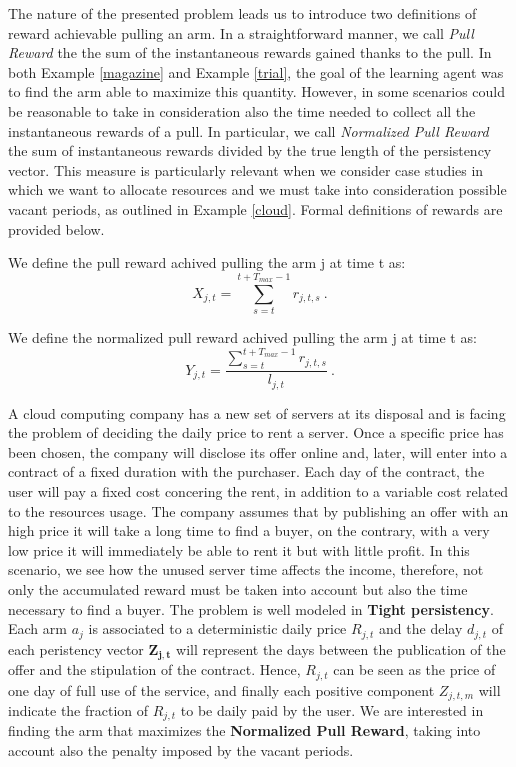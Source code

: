 The nature of the presented problem leads us to introduce two definitions of reward achievable pulling an arm. In a straightforward manner, we call \emph{Pull Reward} the the sum of the instantaneous rewards gained thanks to the pull. In both Example \ref{magazine} and Example \ref{trial}, the goal of the learning agent was to find the arm able to maximize this quantity. However, in some scenarios could be reasonable to take in consideration also the time needed to collect all the instantaneous rewards of a pull. In particular, we call \emph{Normalized Pull Reward} the sum of instantaneous rewards divided by the true length of the persistency vector.
This measure is particularly relevant when we consider case studies in which we want to allocate resources and we must take into consideration possible vacant periods, as outlined in Example \ref{cloud}.
Formal definitions of rewards are provided below.


\begin{definition}
	We define the pull reward achived pulling the arm j at time t as:
		$$X_{j,t} = \sum_{s=t}^{t+T_{max}-1} r_{j,t,s} \ .$$
\end{definition}

\begin{definition}
	We define the normalized pull reward achived pulling the arm j at time t as:
		$$Y_{j,t} = \dfrac{\sum_{s=t}^{t+T_{max}-1} r_{j,t,s}}{l_{j,t}} \ .$$
\end{definition}

\begin{example}
\label{cloud}
A cloud computing company has a new set of servers at its disposal and is facing the problem of deciding the daily price to rent a server. Once a specific price has been chosen, the company will disclose its offer online and, later, will enter into a contract of a fixed duration with the purchaser. Each day of the contract, the user will pay a fixed cost concering the rent, in addition to a variable cost related to the resources usage. The company assumes that by publishing an offer with an high price it will take a long time to find a buyer, on the contrary, with a very low price it will immediately be able to rent it but with little profit. In this scenario, we see how the unused server time affects the income, therefore, not only the accumulated reward must be taken into account but also the time necessary to find a buyer. The problem is well modeled in 	\textbf{Tight persistency}. Each arm $a_j$ is associated to a deterministic daily price $R_{j,t}$ and the delay $d_{j,t}$ of each peristency vector $\boldsymbol{Z_{j,t}}$ will represent the days between the publication of the offer and the stipulation of the contract. Hence, $R_{j,t}$ can be seen as the price of one day of full use of the service, and finally each positive component $Z_{j,t,m}$ will indicate the fraction of $R_{j,t}$ to be daily paid by the user. We are interested in finding the arm that maximizes the \textbf{Normalized Pull Reward}, taking into account also the penalty imposed by the vacant periods.

\end{example}


